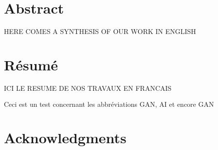 \cleardoublepage
\setcounter{page}{1}

\chapter{Abstract}
HERE COMES A SYNTHESIS OF OUR WORK IN ENGLISH

\cleardoublepage


\chapter{R\'esum\'e}

ICI LE RESUME DE NOS TRAVAUX EN FRANCAIS

Ceci est un test concernant les abbréviations \ac{GAN}, \ac{AI} et encore \ac{GAN}



\cleardoublepage
\chapter{Acknowledgments}


